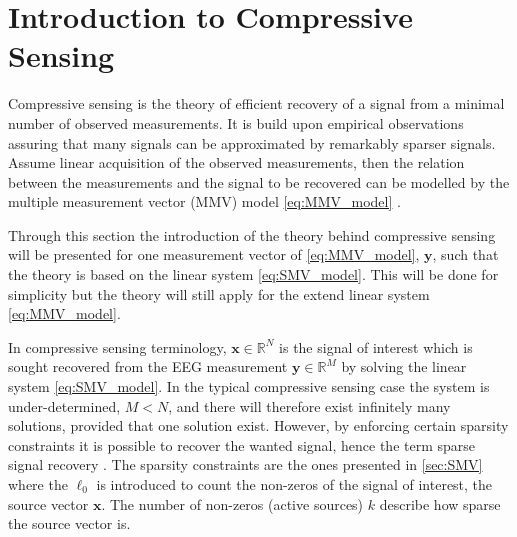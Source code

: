 \section{Introduction to Compressive Sensing}\label{sec:CS}
Compressive sensing is the theory of efficient recovery of a signal from a minimal number of observed measurements. 
It is build upon empirical observations assuring that many signals can be approximated by remarkably sparser signals.   
Assume linear acquisition of the observed measurements, then the relation between the measurements and the signal to be recovered can be modelled by the multiple measurement vector (MMV) model \eqref{eq:MMV_model} \cite{FR}. 

Through this section the introduction of the theory behind compressive sensing will be presented for one measurement vector of \eqref{eq:MMV_model}, $\mathbf{y}$, such that the theory is based on the linear system \eqref{eq:SMV_model}. This will be done for simplicity but the theory will still apply for the extend linear system \eqref{eq:MMV_model}.

In compressive sensing terminology, $\mathbf{x} \in \mathbb{R}^N$ is the signal of interest which is sought recovered from the EEG measurement $\mathbf{y} \in \mathbb{R}^M$ by solving the linear system \eqref{eq:SMV_model}. 
In the typical compressive sensing case the system is under-determined, $M < N$, and there will therefore exist infinitely many solutions, provided that one solution exist.
However, by enforcing certain sparsity constraints it is possible to recover the wanted signal, hence the term sparse signal recovery \cite{FR}. The sparsity constraints are the ones presented in \ref{sec:SMV} where the $\ell_0$ is introduced to count the non-zeros of the signal of interest, the source vector $\mathbf{x}$. The number of non-zeros (active sources) $k$ describe how sparse the source vector is.
 
